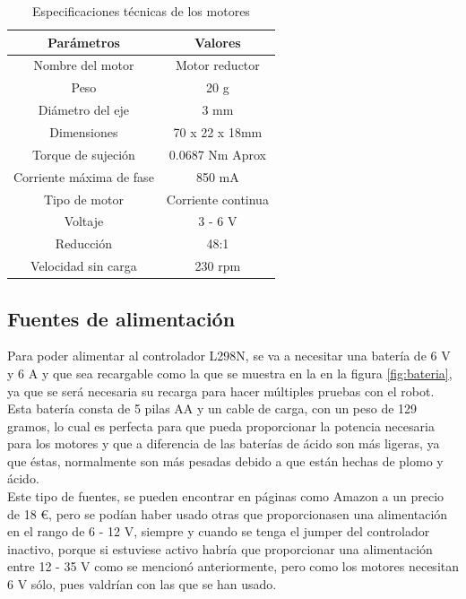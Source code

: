 \begin{table}[H]
\begin{center}
\begin{tabular}{|c|c|}
\hline
\textbf{Parámetros} & \textbf{Valores} \\
\hline

Nombre del motor & Motor reductor \\
Peso & 20 g \\  
Diámetro del eje & 3 mm \\   
Dimensiones & 70 x 22 x 18mm \\   
Torque de sujeción & 0.0687 Nm Aprox \\
Corriente máxima de fase & 850 mA \\  
Tipo de motor & Corriente continua \\   
Voltaje & 3 - 6 V \\  
Reducción & 48:1 \\ 
Velocidad sin carga & 230 rpm \\ 


\hline
\end{tabular}
\caption{Especificaciones técnicas de los motores}
\label{cuadro:ejemplo}
\end{center}
\end{table}


\subsection{Fuentes de alimentación}
\label{subsec:fuentes_alimentacion}

Para poder alimentar al controlador L298N, se va a necesitar una batería de 6 V y 6 A y que sea recargable como la que se muestra en la 
en la figura \ref{fig:bateria}, ya que se será necesaria su recarga para hacer múltiples pruebas con el robot. Esta batería consta de 5 pilas AA y un cable de carga, con un peso de 129 gramos, lo cual es perfecta para que pueda proporcionar la potencia necesaria para los motores y que a diferencia de las baterías de ácido son más ligeras, ya que éstas, normalmente son más pesadas debido a que están hechas de plomo y ácido.\\

Este tipo de fuentes, se pueden encontrar en páginas como Amazon a un precio de 18 \euro, pero se podían haber usado otras que proporcionasen una alimentación en el rango de 6 - 12 V, siempre y cuando se tenga el jumper del controlador inactivo, porque si estuviese activo habría que proporcionar una alimentación entre 12 - 35 V como se mencionó anteriormente, pero como los motores necesitan 6 V sólo, pues valdrían con las que se han usado. \\


